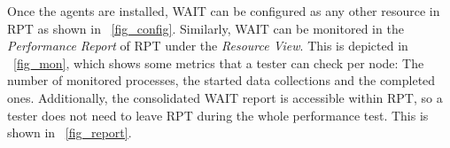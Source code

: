 \documentclass[runningheads,a4paper]{llncs}
\begin{document}
Once the agents are installed, WAIT can be configured as
any other resource in RPT as shown in \figurename ~\ref{fig_config}. Similarly,
WAIT can be monitored in the \emph{Performance Report} of RPT
under the \emph{Resource View}. This is depicted in \figurename ~\ref{fig_mon},
which shows some metrics that a tester can check per node: The
number of monitored processes, the started data collections and the completed ones.
Additionally, the consolidated WAIT report is accessible within RPT, so a tester
does not need to leave RPT during the whole performance test. This is shown in \figurename ~\ref{fig_report}. 

\vspace{-5pt}
\end{document}
